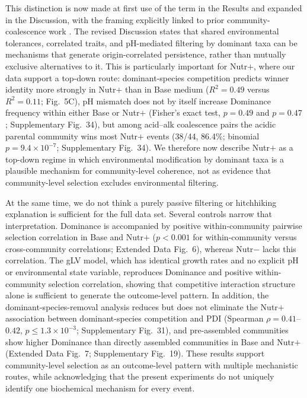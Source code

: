 This distinction is now made at first use of the term in the Results and expanded in the Discussion, with the framing explicitly linked to prior community-coalescence work \citep{Mansour2018,Rillig2015}. The revised Discussion states that shared environmental tolerances, correlated traits, and pH-mediated filtering by dominant taxa can be mechanisms that generate origin-correlated persistence, rather than mutually exclusive alternatives to it. This is particularly important for Nutr$+$, where our data support a top-down route: dominant-species competition predicts winner identity more strongly in Nutr$+$ than in Base medium ($R^2 = 0.49$ versus $R^2 = 0.11$; Fig.~5C), pH mismatch does not by itself increase Dominance frequency within either Base or Nutr$+$ (Fisher's exact test, $p = 0.49$ and $p = 0.47$; Supplementary Fig.~34), but among acid--alk coalescence pairs the acidic parental community wins most Nutr$+$ events (38/44, 86.4\%; binomial $p = 9.4 \times 10^{-7}$; Supplementary Fig.~34). We therefore now describe Nutr$+$ as a top-down regime in which environmental modification by dominant taxa is a plausible mechanism for community-level coherence, not as evidence that community-level selection excludes environmental filtering.

At the same time, we do not think a purely passive filtering or hitchhiking explanation is sufficient for the full data set. Several controls narrow that interpretation. Dominance is accompanied by positive within-community pairwise selection correlation in Base and Nutr$+$ ($p < 0.001$ for within-community versus cross-community correlations; Extended Data Fig.~6), whereas Nutr$-$ lacks this correlation. The gLV model, which has identical growth rates and no explicit pH or environmental state variable, reproduces Dominance and positive within-community selection correlation, showing that competitive interaction structure alone is sufficient to generate the outcome-level pattern. In addition, the dominant-species-removal analysis reduces but does not eliminate the Nutr$+$ association between dominant-species competition and PDI (Spearman $\rho = 0.41$--$0.42$, $p \leq 1.3 \times 10^{-3}$; Supplementary Fig.~31), and pre-assembled communities show higher Dominance than directly assembled communities in Base and Nutr$+$ (Extended Data Fig.~7; Supplementary Fig.~19). These results support community-level selection as an outcome-level pattern with multiple mechanistic routes, while acknowledging that the present experiments do not uniquely identify one biochemical mechanism for every event.

